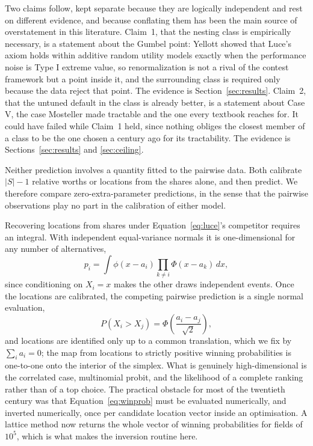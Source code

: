\documentclass[11pt]{article}
\begin{document}
Two claims follow, kept separate because they are logically independent and rest on
different evidence, and because conflating them has been the main source of
overstatement in this literature. Claim~1, that the nesting class is empirically
necessary, is a statement about the Gumbel point: Yellott \cite{yellott1977} showed
that Luce's axiom holds within additive random utility models exactly when the
performance noise is Type I extreme value, so renormalization is not a rival of the
contest framework but a point inside it, and the surrounding class is required only
because the data reject that point. The evidence is
Section~\ref{sec:results}. Claim~2, that the untuned default in the class is already
better, is a statement about Case V, the case Mosteller \cite{mosteller1951} made
tractable and the one every textbook reaches for. It could have failed while Claim~1
held, since nothing obliges the closest member of a class to be the one chosen a
century ago for its tractability. The evidence is
Sections~\ref{sec:results} and \ref{sec:ceiling}.

Neither prediction involves a quantity fitted to the pairwise data. Both calibrate
$|S|-1$ relative worths or locations from the shares alone, and then predict. We
therefore compare zero-extra-parameter predictions, in the sense that the pairwise
observations play no part in the calibration of either model.

Recovering locations from shares under Equation~\eqref{eq:luce}'s competitor
requires an integral. With independent equal-variance normals it is
one-dimensional for any number of alternatives,
\begin{equation}
p_i = \int \phi(x - a_i) \prod_{k \neq i} \Phi(x - a_k)\, dx,
\label{eq:winprob}
\end{equation}
since conditioning on $X_i = x$ makes the other draws independent events. Once the
locations are calibrated, the competing pairwise prediction is a single normal
evaluation,
\begin{equation}
P(X_i > X_j) = \Phi\!\left(\frac{a_i - a_j}{\sqrt{2}}\right),
\label{eq:pair}
\end{equation}
and locations are identified only up to a common translation, which we fix by
$\sum_i a_i = 0$; the map from locations to strictly positive winning probabilities is
one-to-one onto the interior of the simplex. What is
genuinely high-dimensional is the correlated case, multinomial probit, and the
likelihood of a complete ranking rather than of a top choice. The practical
obstacle for most of the twentieth century was that Equation~\eqref{eq:winprob}
must be evaluated numerically, and inverted numerically, once per candidate
location vector inside an optimisation. A lattice method \cite{cotton2021} now
returns the whole vector of winning probabilities for fields of $10^5$, which is
what makes the inversion routine here.
\end{document}
